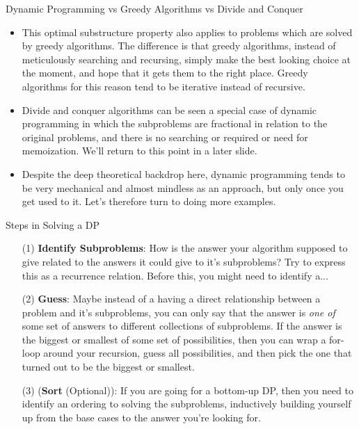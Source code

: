 \documentclass{beamer}
\begin{document}
\begin{frame}{Dynamic Programming vs Greedy Algorithms vs Divide and Conquer}
    \begin{itemize}
        \item This optimal substructure property also applies to problems which are solved by greedy algorithms. The difference is that greedy algorithms, instead of meticulously searching and recursing, simply make the best looking choice at the moment, and hope that it gets them to the right place. Greedy algorithms for this reason tend to be iterative instead of recursive. 
        \item Divide and conquer algorithms can be seen a special case of dynamic programming in which the subproblems are fractional in relation to the original problems, and there is no searching or required or need for memoization. We'll return to this point in a later slide.
        \item Despite the deep theoretical backdrop here, dynamic programming tends to be very mechanical and almost mindless as an approach, but only once you get used to it. Let's therefore turn to doing more examples. 
    \end{itemize}
\end{frame}

\begin{frame}{Steps in Solving a DP}
    \begin{itemize}
        \item[(1)] \textbf{Identify Subproblems}: How is the answer your algorithm supposed to give related to the answers it could give to it's subproblems? Try to express this as a recurrence relation. Before this, you might need to identify a... \pause 
        \item[(2)] \textbf{Guess}: Maybe instead of a having a direct relationship between a problem and it's subproblems, you can only say that the answer is \emph{one of} some set of answers to different collections of subproblems. If the answer is the biggest or smallest of some set of possibilities, then you can wrap a for-loop around your recursion, guess all possibilities, and then pick the one that turned out to be the biggest or smallest.
        \item[(3)] (\textbf{Sort} (Optional)): If you are going for a bottom-up DP, then you need to identify an ordering to solving the subproblems, inductively building yourself up from the base cases to the answer you're looking for. 
    \end{itemize}
\end{frame}
\end{document}
